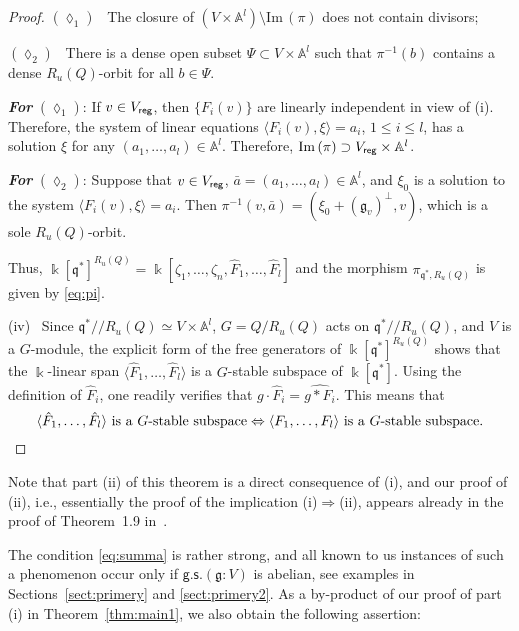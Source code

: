 \begin{proof}
$(\lozenge_1)$ \ The closure of $(V\times\mathbb A^l)\setminus {{\mathrm{Im\,}}}(\pi)$ does not contain divisors;

$(\lozenge_2)$ \ There is a dense open subset $\Psi\subset V\times\mathbb A^l$ such that $\pi^{-1}(b)$ contains a dense $R_u(Q)$-orbit for all $b\in\Psi$.

\noindent
{\it\bfseries For} $(\lozenge_1)$:  If $v\in V_{\sf reg}$, then $\{F_i(v)\}$ are linearly independent in view of (i). Therefore, the system of linear equations $\langle F_i(v),\xi\rangle=a_i$, $1{\leqslant} i{\leqslant} l$,  has a solution $\xi$ for any 
$(a_1,\dots,a_l)\in\mathbb A^l$. Therefore, ${{\mathrm{Im\,}}}(\pi)\supset V_{\sf reg}\times \mathbb A^l$.

\noindent
{\it\bfseries For} $(\lozenge_2)$: Suppose that $v\in V_{\sf reg}$, $\bar a=(a_1,\dots,a_l)\in \mathbb A^l$, and 
$\xi_0$ is a solution to the system $\langle F_i(v),\xi\rangle=a_i$. Then $\pi^{-1}(v,\bar a)=
(\xi_0+ ({{\mathfrak g}}_v)^\perp, v)$, which is a sole $R_u(Q)$-orbit.

Thus,  ${\Bbbk}[{{\mathfrak q}}^*]^{R_u(Q)}={\Bbbk}[\zeta_1,\dots,\zeta_n, \hat F_1,\dots, \hat F_l]$ 
and the morphism  $\pi_{{{\mathfrak q}}^*,R_u(Q)}$ is given by \eqref{eq:pi}.

(iv) \ Since ${{\mathfrak q}}^*{/\!\!/} {R_u(Q)}\simeq V\times \mathbb A^l$, $G=Q/R_u(Q)$ acts on ${{\mathfrak q}}^*{/\!\!/} {R_u(Q)}$, and $V$ is a $G$-module, the explicit form of the free generators of 
${\Bbbk}[{{\mathfrak q}}^*]^{R_u(Q)}$ shows that the ${\Bbbk}$-linear span $\langle \hat F_1,\dots, \hat F_l\rangle$ is a $G$-stable subspace of ${\Bbbk}[{{\mathfrak q}}^*]$. Using the definition of $\hat F_i$, one readily verifies that 
$g{\cdot}\hat F_i=\widehat{g{\ast} F_i}$. This means that 
\[
  \text{$\langle \hat F_1,\dots, \hat F_l\rangle$ is a $G$-stable subspace}  \Leftrightarrow
  \text{$\langle F_1,\dots, F_l\rangle$ is a $G$-stable subspace} .  \qedhere
\]
\end{proof}

Note that part (ii) of this theorem is a direct consequence of (i),  and our proof of (ii), i.e., essentially the proof of the implication (i)$\Rightarrow$(ii), appears already in the proof of Theorem~1.9 in~\cite{jac}.

The condition \eqref{eq:summa} is rather strong, and all known to us instances of such a 
phenomenon occur only if $\mathsf{g.s.}({{\mathfrak g}}:V)$ is abelian, see examples in Sections~\ref{sect:primery} and
\ref{sect:primery2}. As a by-product of our proof of part (i) in Theorem~\ref{thm:main1}, we also obtain the
following assertion:

